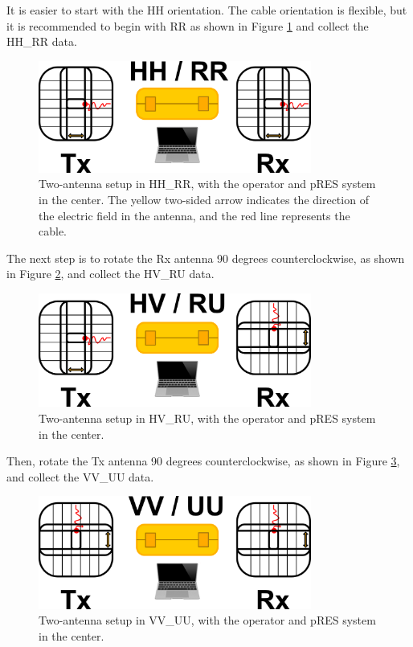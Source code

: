 \documentclass[a4paper,12pt]{article}
\begin{document}
It is easier to start with the HH orientation. The cable orientation is flexible, but it is
recommended to begin with RR as shown in Figure \ref{fig:HHRR} and collect the HH\_RR data.

\begin{figure}[H]
    \centering
    \includegraphics[width=0.8\textwidth]{figures/HHRR.png}
    \caption{Two-antenna setup in HH\_RR, with the operator and pRES system in the center. 
    The yellow two-sided arrow indicates the direction of the electric field in the antenna, and the red line represents the cable.}
    \label{fig:HHRR}
\end{figure}

The next step is to rotate the Rx antenna 90 degrees counterclockwise, as shown in Figure
\ref{fig:HVRU}, and collect the HV\_RU data.

\begin{figure}[H]
    \centering
    \includegraphics[width=0.8\textwidth]{figures/HVRU.png}
    \caption{Two-antenna setup in HV\_RU, with the operator and pRES system in the center.}
    \label{fig:HVRU}
\end{figure}

Then, rotate the Tx antenna 90 degrees counterclockwise, as shown in Figure \ref{fig:VVUU}, and
collect the VV\_UU data.

\begin{figure}[H]
    \centering
    \includegraphics[width=0.8\textwidth]{figures/VVUU.png}
    \caption{Two-antenna setup in VV\_UU, with the operator and pRES system in the center.}
    \label{fig:VVUU}
\end{figure}
\end{document}
